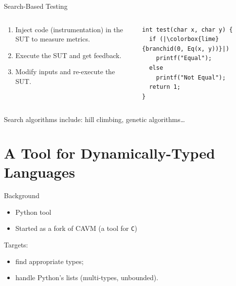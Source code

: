 \documentclass{beamer}
\begin{document}
\begin{frame}[fragile]{Search-Based Testing}
  \begin{columns}
    \begin{column}{0.5\textwidth}
      \begin{enumerate}
        \item Inject code (instrumentation) in the SUT to measure metrics.
        \item Execute the SUT and get feedback.
        \item Modify inputs and re-execute the SUT.
      \end{enumerate}
    \end{column}
    \begin{column}{0.5\textwidth}
      \begin{verbatim}
int test(char x, char y) {
  if (|\colorbox{lime}{branchid(0, Eq(x, y))}|)
    printf("Equal");
  else
    printf("Not Equal");
  return 1;
}
      \end{verbatim}
    \end{column}
  \end{columns}

  \vfill

  Search algorithms include: hill climbing, genetic algorithms\dots
\end{frame}


\section{A Tool for Dynamically-Typed Languages}

\begin{frame}{Background}
  \begin{itemize}
    \item Python tool
    \item Started as a fork of CAVM (a tool for \texttt{C})
  \end{itemize}

  Targets:
  \begin{itemize}
    \item find appropriate types;
    \item handle Python's lists (multi-types, unbounded).
  \end{itemize}
\end{frame}
\end{document}
